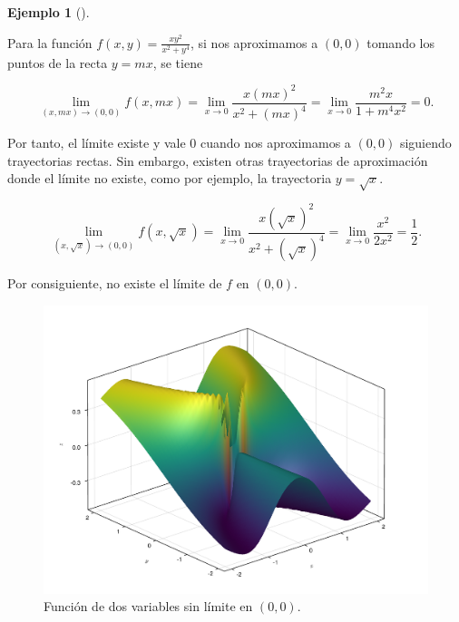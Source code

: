 \documentclass[
  a4paper,
]{scrreport}
\theoremstyle{definition}
\theoremstyle{plain}
\theoremstyle{plain}
\theoremstyle{definition}
\theoremstyle{definition}
\newtheorem{example}{Ejemplo}[chapter]
\theoremstyle{plain}
\theoremstyle{remark}
\begin{document}
\begin{example}[]\protect\hypertarget{exm-no-existencia-limite-2}{}\label{exm-no-existencia-limite-2}

Para la función \(f(x,y)=\frac{xy^2}{x^2+y^4}\), si nos aproximamos a
\((0,0)\) tomando los puntos de la recta \(y=mx\), se tiene

\[
\lim_{(x,mx)\to(0,0)} f(x,mx) 
= \lim_{x\to 0} \frac{x(mx)^2}{x^2+(mx)^4}
= \lim_{x\to 0} \frac{m^2x}{1+m^4x^2}
= 0.
\]

Por tanto, el límite existe y vale \(0\) cuando nos aproximamos a
\((0,0)\) siguiendo trayectorias rectas. Sin embargo, existen otras
trayectorias de aproximación donde el límite no existe, como por
ejemplo, la trayectoria \(y = \sqrt{x}\).

\[
\lim_{(x,\sqrt{x})\to(0,0)} f(x,\sqrt{x}) 
= \lim_{x\to 0} \frac{x(\sqrt{x})^2}{x^2+(\sqrt{x})^4}
= \lim_{x\to 0} \frac{x^2}{2x^2}
= \frac{1}{2}.
\]

Por consiguiente, no existe el límite de \(f\) en \((0,0)\).

\begin{figure}

{\centering \includegraphics{./img/derivadas-funciones-varias-variables/no-existencia-limite.pdf}

}

\caption{\label{fig-no-existencia-limite-2}Función de dos variables sin
límite en \((0,0)\).}

\end{figure}

\end{example}
\end{document}
